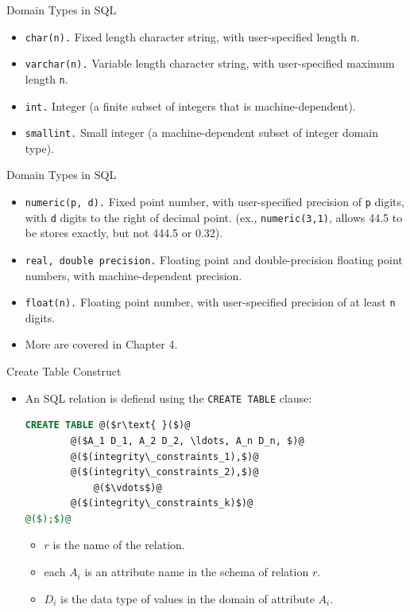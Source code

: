 \documentclass{beamer}
\begin{document}
\begin{frame}{Domain Types in SQL}
    \begin{itemize}
        \item \texttt{char(n).} Fixed length character string, with user-specified length \texttt{n}.
        \item \texttt{varchar(n).} Variable length character string, with user-specified maximum length \texttt{n}.
        \item \texttt{int.} Integer (a finite subset of integers that is machine-dependent).
        \item \texttt{smallint.} Small integer (a machine-dependent subset of integer domain type).
    \end{itemize}
\end{frame}

\begin{frame}{Domain Types in SQL}
    \begin{itemize}
        \item \texttt{numeric(p, d).} Fixed point number, with user-specified precision of \texttt{p} digits, with \texttt{d} digits to the right of decimal point. (ex., \texttt{numeric(3,1)}, allows 44.5 to be stores exactly, but not 444.5 or 0.32).
        \item \texttt{real, double precision.} Floating point and double-precision floating point numbers, with machine-dependent precision.
        \item \texttt{float(n).} Floating point number, with user-specified precision of at least \texttt{n} digits.
        \item More are covered in Chapter 4.
    \end{itemize}
\end{frame}

\begin{frame}[fragile]{Create Table Construct}
    \begin{itemize}
        \item An SQL relation is defiend using the \texttt{CREATE TABLE} clause:
        \begin{lstlisting}[language=SQL]
CREATE TABLE @($r\text{ }($)@
        @($A_1 D_1, A_2 D_2, \ldots, A_n D_n, $)@
        @($(integrity\_constraints_1),$)@
        @($(integrity\_constraints_2),$)@
            @($\vdots$)@
        @($(integrity\_constraints_k)$)@
@($);$)@
        \end{lstlisting}
        \begin{itemize}
            \item $r$ is the name of the relation.
            \item each $A_i$ is an attribute name in the schema of relation $r$.
            \item $D_i$ is the data type of values in the domain of attribute $A_i$.
        \end{itemize}
    \end{itemize}
\end{frame}
\end{document}
